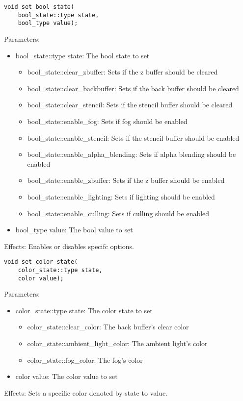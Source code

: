 \documentclass{article}
\begin{document}
\begin{lstlisting}
void set_bool_state(
	bool_state::type state,
	bool_type value);
\end{lstlisting}
Parameters:
\begin{itemize}
\item bool\_state::type state: The bool state to set
  \begin{itemize}
  \item bool\_state::clear\_zbuffer: Sets if the z buffer should be cleared
  \item bool\_state::clear\_backbuffer: Sets if the back buffer should be cleared
  \item bool\_state::clear\_stencil: Sets if the stencil buffer should be cleared
  \item bool\_state::enable\_fog: Sets if fog should be enabled
  \item bool\_state::enable\_stencil: Sets if the stencil buffer should be enabled
  \item bool\_state::enable\_alpha\_blending: Sets if alpha blending should be enabled
  \item bool\_state::enable\_zbuffer: Sets if the z buffer should be enabled
  \item bool\_state::enable\_lighting: Sets if lighting should be enabled
  \item bool\_state::enable\_culling: Sets if culling should be enabled
  \end{itemize}
\item bool\_type value: The bool value to set
\end{itemize}
Effects: Enables or disables specifc options.

\begin{lstlisting}
void set_color_state(
	color_state::type state,
	color value);
\end{lstlisting}
Parameters:
\begin{itemize}
\item color\_state::type state: The color state to set
  \begin{itemize}
  \item color\_state::clear\_color: The back buffer's clear color
  \item color\_state::ambient\_light\_color: The ambient light's color
  \item color\_state::fog\_color: The fog's color
  \end{itemize}
\item color value: The color value to set
\end{itemize}
Effects: Sets a specific color denoted by state to value.
	
\end{document}
